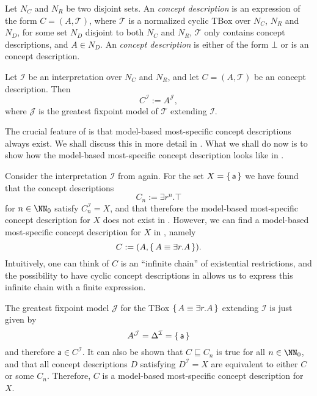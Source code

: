 \begin{Definition}
  \label{def:ELgfpbot-concept-descriptions-and-their-semantics}
  Let $N_C$ and $N_R$ be two disjoint sets.  An \emph{\ELgfp concept description} is an
  expression of the form $C = (A, \mathcal{T})$, where $\mathcal{T}$ is a normalized
  cyclic TBox over $N_C$, $N_R$ and $N_D$, for some set $N_D$ disjoint to both $N_C$ and
  $N_R$, $\mathcal{T}$ only contains \EL concept descriptions, and $A \in N_D$.  An
  \emph{\ELgfpbot concept description} is either of the form $\bot$ or is an \ELgfp
  concept description.

  Let $\mathcal{I}$ be an interpretation over $N_{C}$ and $N_{R}$, and let $C = (A,
  \mathcal{T})$ be an \ELgfpbot concept description.  Then
  \begin{equation*}
    C^{\mathcal{I}} := A^{\mathcal{J}},
  \end{equation*}
  where $\mathcal{J}$ is the greatest fixpoint model of $\mathcal{T}$ extending
  $\mathcal{I}$.
\end{Definition}

The crucial feature of \ELgfpbot is that model-based most-specific concept descriptions
always exist.  We shall discuss this in more detail in .  What we
shall do now is to show how the model-based most-specific concept description looks like
in .

\begin{Example}
  \label{expl:mmsc-exist-in-ELgfpbot}
  Consider the interpretation $\mathcal{I}$ from 
  again.  For the set $X = {\{\, \mathsf{a} \,\}}$ we have found that the concept descriptions
  \begin{equation*}
    C_n := \exists r^n. \top
  \end{equation*}
  for $n \in \NN_0$ satisfy $C_n^{\mathcal{I}} = X$, and that therefore the model-based
  most-specific concept description for $X$ does not exist in \ELbot.  However, we can
  find a model-based most-specific concept description for $X$ in \ELgfpbot, namely
  \begin{equation*}
    C := (A, {\{\, A \equiv \exists r. A \,\}}).
  \end{equation*}
  Intuitively, one can think of $C$ is an ``infinite chain'' of existential restrictions,
  and the possibility to have cyclic concept descriptions in \ELgfpbot allows us to
  express this infinite chain with a finite expression.

  The greatest fixpoint model $\mathcal{J}$ for the TBox ${\{\, A \equiv \exists r. A \,\}}$
  extending $\mathcal{I}$ is just given by
  \begin{equation*}
    A^{\mathcal{J}} = \Delta^{\mathcal{I}} = {\{\, \mathsf{a} \,\}}
  \end{equation*}
  and therefore $\mathsf{a} \in C^{\mathcal{I}}$.  It can also be shown that $C
  \sqsubseteq C_n$ is true for all $n \in \NN_0$, and that all \ELgfpbot concept
  descriptions $D$ satisfying $D^{\mathcal{I}} = X$ are equivalent to either $C$ or some
  $C_n$.  Therefore, $C$ is a model-based most-specific concept description for $X$.
\end{Example}

